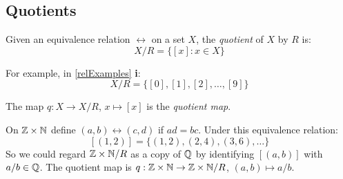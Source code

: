 \documentclass[../main.tex]{subfiles}
\begin{document}
\subsection{Quotients}
\begin{definition}[Quotient]
  Given an equivalence relation $\rel$ on a set $X$, the \textit{quotient} of $X$ by $R$ is:
  \[
    X/R = \{[x]: x \in X\}
  \]
\end{definition}
\begin{example}
  For example, in \cref{relExamples} \textbf{i}:
  \[
    X/R = \{[0], [1], [2], \ldots, [9]\}
  \]
\end{example}
\begin{definition}
  The map $q: X \to X/R$, $x \mapsto [x]$ is the \textit{quotient map}.
\end{definition}
\begin{example}
  On $\mathbb{Z}\times\mathbb{N}$ define $(a, b) \rel (c, d)$ if $ad = bc$.
  Under this equivalence relation:
  \[
    [(1, 2)] = \{(1, 2), (2, 4), (3, 6), \ldots\}
  \]
  So we could regard $\mathbb{Z} \times \mathbb{N} / R$ as a copy of $\mathbb{Q}$ by identifying $[(a, b)]$ with $a/b \in \mathbb{Q}$.
  The quotient map is $q: \mathbb{Z}\times\mathbb{N} \to \mathbb{Z}\times\mathbb{N}/R$, $(a, b) \mapsto a/b$.
\end{example}
\end{document}
